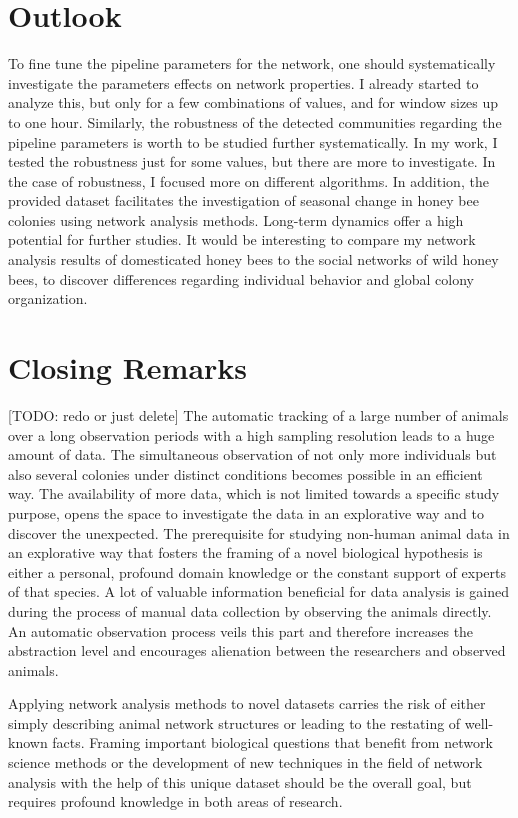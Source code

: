 \section{Outlook}
To fine tune the pipeline parameters for the network, one should systematically investigate the parameters effects on network properties. I already started to analyze this, but only for a few combinations of values, and for window sizes up to one hour.
Similarly, the robustness of the detected communities regarding the pipeline parameters is worth to be studied further systematically.
In my work, I tested the robustness just for some values, but there are more to investigate. In the case of robustness, I  focused more on different algorithms.
In addition, the provided dataset facilitates the investigation of seasonal change in honey bee colonies using network analysis methods. Long-term dynamics offer a high potential for further studies. It would be interesting to compare my network analysis results of domesticated honey bees to the social networks of wild honey bees, to discover differences regarding individual behavior and global colony organization.


\section{Closing Remarks}
[TODO: redo or just delete]
The automatic tracking of a large number of animals over a long observation periods with a high sampling resolution leads to a huge amount of data.
The simultaneous observation of not only more individuals but also several colonies under distinct conditions becomes possible in an efficient way.
The availability of more data, which is not limited towards a specific study purpose, opens the space to investigate the data in an explorative way and to discover the unexpected.
The prerequisite for studying non-human animal data in an explorative way that fosters the framing of a novel biological hypothesis is either a personal, profound domain knowledge or the constant support of experts of that species.
A lot of valuable information beneficial for data analysis is gained during the process of manual data collection by observing the animals directly. An automatic observation process veils this part and therefore increases the abstraction level and encourages alienation between the researchers and observed animals.

Applying network analysis methods to novel datasets carries the risk of either simply describing animal network structures or leading to the restating of well-known facts. Framing important biological questions that benefit from network science methods or the development of new techniques in the field of network analysis with the help of this unique dataset should be the overall goal, but requires profound knowledge in both areas of research.
